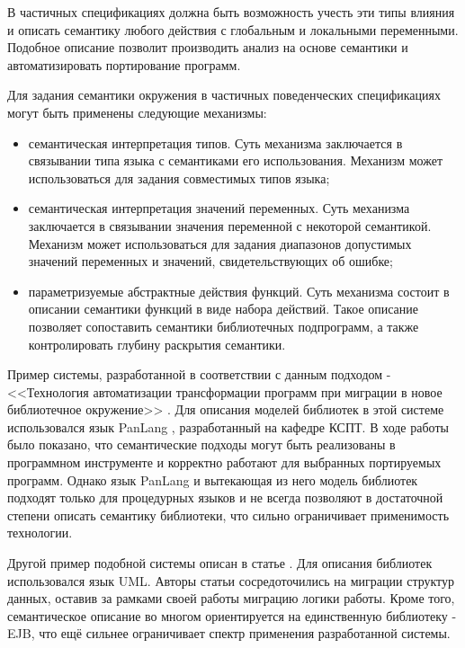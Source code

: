 В частичных спецификациях должна быть возможность учесть эти типы влияния и описать семантику любого действия с глобальным и локальными переменными. Подобное описание позволит производить анализ на основе семантики и автоматизировать портирование программ.

Для задания семантики окружения в частичных поведенческих спецификациях могут быть применены следующие механизмы:

\begin{itemize}
	\item семантическая интерпретация типов. Суть механизма заключается в связывании типа языка с семантиками его использования. Механизм может использоваться для задания совместимых типов языка;

	\item семантическая интерпретация значений переменных. Суть механизма заключается в связывании значения переменной с некоторой семантикой. Механизм может использоваться для задания диапазонов допустимых значений переменных и значений, свидетельствующих об ошибке;

	\item параметризуемые абстрактные действия функций. Суть механизма состоит в описании семантики функций в виде набора действий. Такое описание позволяет сопоставить семантики библиотечных подпрограмм, а также контролировать глубину раскрытия семантики.
\end{itemize}


Пример системы, разработанной в соответствии с данным подходом - <<Технология автоматизации трансформации программ при миграции в новое библиотечное окружение>> \cite{baun}. Для описания моделей библиотек в этой системе использовался язык PanLang \cite{panlang}, разработанный на кафедре КСПТ. В ходе работы было показано, что семантические подходы могут быть реализованы в программном инструменте и корректно работают для выбранных портируемых программ. Однако язык PanLang и вытекающая из него модель библиотек подходят только для процедурных языков и не всегда позволяют в достаточной степени описать семантику библиотеки, что сильно ограничивает применимость технологии.

Другой пример подобной системы описан в статье \cite{christoph2003great}. Для описания библиотек использовался язык UML. Авторы статьи сосредоточились на миграции структур данных, оставив за рамками своей работы миграцию логики работы. Кроме того, семантическое описание во многом ориентируется на единственную библиотеку - EJB, что ещё сильнее ограничивает спектр применения разработанной системы.

